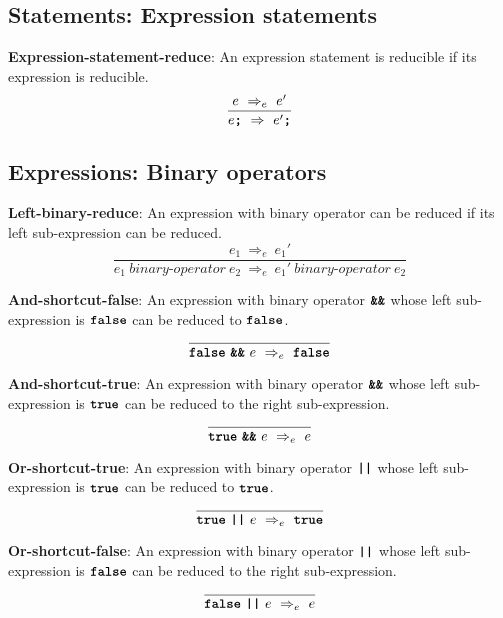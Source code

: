\subsection*{Statements: Expression statements}

\textbf{Expression-statement-reduce}: An expression statement
is reducible if its expression is reducible.
\[
\frac{
  e\ \Rightarrow_e\ e'
}{  
  e \textbf{\texttt{;}}
  \ \Rightarrow \ 
  e' \textbf{\texttt{;}}
}
\]


\subsection*{Expressions: Binary operators}

\textbf{Left-binary-reduce}: An expression with binary operator
can be reduced if its left sub-expression can be reduced.
\[
\frac{
  e_1 \ \Rightarrow_e \ e_1'
}{
  e_1\  \textit{binary-operator} \ e_2
  \ \Rightarrow_e \ 
  e_1'\  \textit{binary-operator} \ e_2
}
\]


\vspace{10mm}
\textbf{And-shortcut-false}: An expression with binary operator
$\textbf{\texttt{\&\&}}$ whose left sub-expression is
$\textbf{\texttt{false}}$ can be reduced to
$\textbf{\texttt{false}}$.
\[
\frac{
}{
  \textbf{\texttt{false}}\  \textbf{\texttt{\&\&}}\ e
  \ \Rightarrow_e \ 
  \textbf{\texttt{false}}
}
\]

\vspace{10mm}
\textbf{And-shortcut-true}: An expression with binary operator
$\textbf{\texttt{\&\&}}$ whose left sub-expression is
$\textbf{\texttt{true}}$ can be reduced to
the right sub-expression.
\[
\frac{
}{
  \textbf{\texttt{true}}\  \textbf{\texttt{\&\&}}\ e
  \ \Rightarrow_e \ 
  e
}
\]

\vspace{10mm}
\textbf{Or-shortcut-true}: An expression with binary operator
$\textbf{\texttt{||}}$ whose left sub-expression is
$\textbf{\texttt{true}}$ can be reduced to
$\textbf{\texttt{true}}$.
\[
\frac{
}{
  \textbf{\texttt{true}}\  \textbf{\texttt{||}}\ e
  \ \Rightarrow_e \ 
  \textbf{\texttt{true}}
}
\]

\vspace{10mm}
\textbf{Or-shortcut-false}: An expression with binary operator
$\textbf{\texttt{||}}$ whose left sub-expression is
$\textbf{\texttt{false}}$ can be reduced to
the right sub-expression.
\[
\frac{
}{
  \textbf{\texttt{false}}\  \textbf{\texttt{||}}\ e
  \ \Rightarrow_e \ 
  e
}
\]


